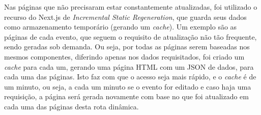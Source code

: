 Nas páginas que não precisaram estar constantemente atualizadas, foi utilizado o recurso do Next.js de \textit{Incremental Static Regeneration}, que guarda seus dados como armazenamento temporário (gerando um \textit{cache}). Um exemplo são as páginas de cada evento, que seguem o requisito de atualização não tão frequente, sendo geradas sob demanda. Ou seja, por todas as páginas serem baseadas nos mesmos componentes, diferindo apenas nos dados requisitados, foi criado um \textit{cache} para cada um, gerando uma página HTML com um JSON de dados, para cada uma das páginas. Isto faz com que o acesso seja mais rápido, e o \textit{cache} é de um minuto, ou seja, a cada um minuto se o evento for editado e caso haja uma requisição, a página será gerada novamente com base no que foi atualizado em cada uma das páginas desta rota dinâmica.
